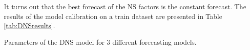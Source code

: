             It turns out that the best forecast of the NS factors is the constant forecast. The results of the model calibration on a train dataset are presented in Table \ref{tab:DNSresults}.
            \begin{table}[htbp]
                \centering
                
                \caption{Parameters of the DNS model for 3 different forecasting models.}
                \label{tab:DNSresults}
            \end{table}
